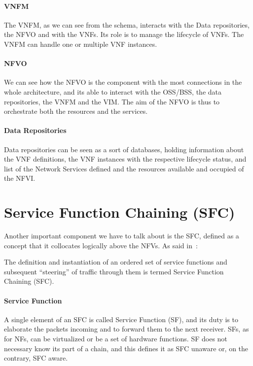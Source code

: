 \paragraph{VNFM}
The VNFM, as we can see from the schema, interacts with the Data repositories,
the NFVO and with the VNFs. Its role is to manage the lifecycle of VNFs. The
VNFM can handle one or multiple VNF instances.

\paragraph{NFVO}
We can see how the NFVO is the component with the most connections in the whole
architecture, and its able to interact with the OSS/BSS, the data repositories,
the VNFM and the VIM. The aim of the NFVO is thus to orchestrate both the
resources and the services.

\paragraph{Data Repositories}
Data repositories can be seen as a sort of databases, holding information about
the VNF definitions, the VNF instances with the respective lifecycle status, and
list of the Network Services defined and the resources available and occupied of
the NFVI.

\section{Service Function Chaining (SFC)}
\label{chap:background:sec:sfc}
Another important component we have to talk about is the SFC, defined as a
concept that it collocates logically above the NFVs. As said in~\cite{rfc7665}:
\begin{displayquote}
The definition and instantiation of an ordered set of service functions and
subsequent ``steering'' of traffic through them is termed Service Function
Chaining (SFC).
\end{displayquote}

\paragraph*{Service Function}
A single element of an SFC is called Service Function (SF), and its duty is to
elaborate the packets incoming and to forward them to the next receiver. SFs, as
for NFs, can be virtualized or be a set of hardware functions. SF does not
necessary know its part of a chain, and this defines it as SFC unaware or, on
the contrary, SFC aware.

